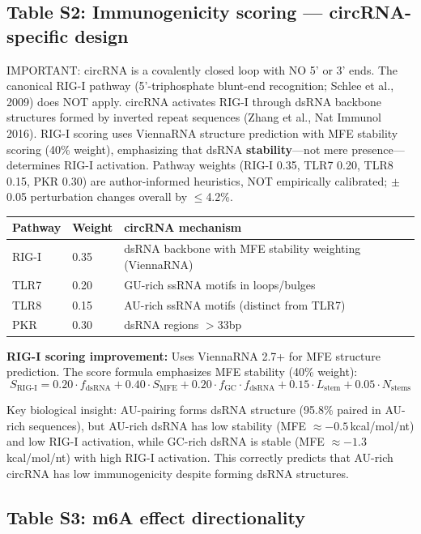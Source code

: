\subsection*{Table S2: Immunogenicity scoring — circRNA-specific design}

\small IMPORTANT: circRNA is a covalently closed loop with NO 5' or 3' ends. The canonical RIG-I pathway (5'-triphosphate blunt-end recognition; Schlee et al., 2009) does NOT apply. circRNA activates RIG-I through dsRNA backbone structures formed by inverted repeat sequences (Zhang et al., Nat Immunol 2016). RIG-I scoring uses ViennaRNA structure prediction with MFE stability scoring (40\% weight), emphasizing that dsRNA \textbf{stability}---not mere presence---determines RIG-I activation. Pathway weights (RIG-I 0.35, TLR7 0.20, TLR8 0.15, PKR 0.30) are author-informed heuristics, NOT empirically calibrated; $\pm$0.05 perturbation changes overall by $\leq$4.2\%.

\begin{tabular}{lll}
\toprule
\textbf{Pathway} & \textbf{Weight} & \textbf{circRNA mechanism} \\
\midrule
RIG-I & 0.35 & dsRNA backbone with MFE stability weighting (ViennaRNA) \\
TLR7 & 0.20 & GU-rich ssRNA motifs in loops/bulges \\
TLR8 & 0.15 & AU-rich ssRNA motifs (distinct from TLR7) \\
PKR & 0.30 & dsRNA regions $>$33bp \\
\bottomrule
\end{tabular}

\textbf{RIG-I scoring improvement:} Uses ViennaRNA 2.7+ for MFE structure prediction. The score formula emphasizes MFE stability (40\% weight):
$$S_{\text{RIG-I}} = 0.20 \cdot f_{\text{dsRNA}} + 0.40 \cdot S_{\text{MFE}} + 0.20 \cdot f_{\text{GC}} \cdot f_{\text{dsRNA}} + 0.15 \cdot L_{\text{stem}} + 0.05 \cdot N_{\text{stems}}$$

Key biological insight: AU-pairing forms dsRNA structure (95.8\% paired in AU-rich sequences), but AU-rich dsRNA has low stability (MFE $\approx -0.5$\,kcal/mol/nt) and low RIG-I activation, while GC-rich dsRNA is stable (MFE $\approx -1.3$\,kcal/mol/nt) with high RIG-I activation. This correctly predicts that AU-rich circRNA has low immunogenicity despite forming dsRNA structures.

\subsection*{Table S3: m6A effect directionality}

